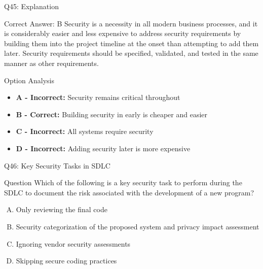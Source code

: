 \documentclass{beamer}
\begin{document}
	\begin{frame}{Q45: Explanation}
		\begin{block}{Correct Answer: B}
			Security is a necessity in all modern business processes, and it is considerably easier and less expensive to address security requirements by building them into the project timeline at the onset than attempting to add them later. Security requirements should be specified, validated, and tested in the same manner as other requirements.
		\end{block}
		\begin{block}{Option Analysis}
			\begin{itemize}
				\item \textbf{A - Incorrect:} Security remains critical throughout
				\item \textbf{B - Correct:} Building security in early is cheaper and easier
				\item \textbf{C - Incorrect:} All systems require security
				\item \textbf{D - Incorrect:} Adding security later is more expensive
			\end{itemize}
		\end{block}
	\end{frame}
	
	\begin{frame}{Q46: Key Security Tasks in SDLC}
		\begin{block}{Question}
			Which of the following is a key security task to perform during the SDLC to document the risk associated with the development of a new program?
		\end{block}
		\begin{enumerate}[(A)]
			\item Only reviewing the final code
			\item Security categorization of the proposed system and privacy impact assessment
			\item Ignoring vendor security assessments
			\item Skipping secure coding practices
		\end{enumerate}
	\end{frame}
	
\end{document}
